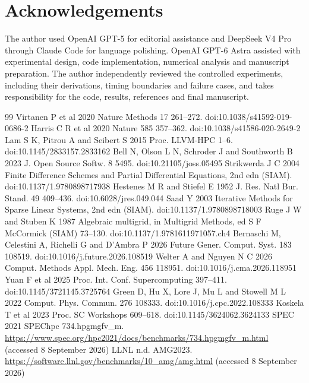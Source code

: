 \documentclass[10pt]{article}
\begin{document}
\section*{Acknowledgements}
The author used OpenAI GPT-5 for editorial assistance and DeepSeek V4 Pro through Claude Code for language polishing. OpenAI GPT-6 Astra assisted with experimental design, code implementation, numerical analysis and manuscript preparation. The author independently reviewed the controlled experiments, including their derivations, timing boundaries and failure cases, and takes responsibility for the code, results, references and final manuscript.
\begin{thebibliography}{99}
\small\setlength{\itemsep}{0pt}\setlength{\parskip}{0pt}
 Virtanen P et al 2020 Nature Methods 17 261--272. doi:10.1038/s41592-019-0686-2
 Harris C R et al 2020 Nature 585 357--362. doi:10.1038/s41586-020-2649-2
 Lam S K, Pitrou A and Seibert S 2015 Proc. LLVM-HPC 1--6. doi:10.1145/2833157.2833162
 Bell N, Olson L N, Schroder J and Southworth B 2023 J. Open Source Softw. 8 5495. doi:10.21105/joss.05495
 Strikwerda J C 2004 Finite Difference Schemes and Partial Differential Equations, 2nd edn (SIAM). doi:10.1137/1.9780898717938
 Hestenes M R and Stiefel E 1952 J. Res. Natl Bur. Stand. 49 409--436. doi:10.6028/jres.049.044
 Saad Y 2003 Iterative Methods for Sparse Linear Systems, 2nd edn (SIAM). doi:10.1137/1.9780898718003
 Ruge J W and Stuben K 1987 Algebraic multigrid, in Multigrid Methods, ed S F McCormick (SIAM) 73--130. doi:10.1137/1.9781611971057.ch4
 Bernaschi M, Celestini A, Richelli G and D'Ambra P 2026 Future Gener. Comput. Syst. 183 108519. doi:10.1016/j.future.2026.108519
 Welter A and Nguyen N C 2026 Comput. Methods Appl. Mech. Eng. 456 118951. doi:10.1016/j.cma.2026.118951
 Yuan F et al 2025 Proc. Int. Conf. Supercomputing 397--411. doi:10.1145/3721145.3725764
 Green D, Hu X, Lore J, Mu L and Stowell M L 2022 Comput. Phys. Commun. 276 108333. doi:10.1016/j.cpc.2022.108333
 Koskela T et al 2023 Proc. SC Workshops 609--618. doi:10.1145/3624062.3624133
 SPEC 2021 SPEChpc 734.hpgmgfv\_m. \url{https://www.spec.org/hpc2021/docs/benchmarks/734.hpgmgfv_m.html} (accessed 8 September 2026)
 LLNL n.d. AMG2023. \url{https://software.llnl.gov/benchmarks/10_amg/amg.html} (accessed 8 September 2026)

\end{thebibliography}
\end{document}
